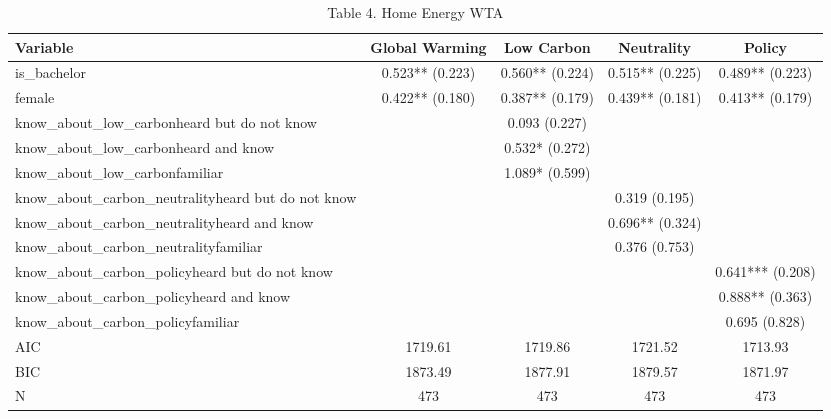 \begin{table}[!htbp]
\centering
\caption{Table 4. Home Energy WTA}
\begin{tabular}{lcccc}
\hline
Variable & Global Warming & Low Carbon & Neutrality & Policy \\
\hline
is\_bachelor & 0.523** (0.223) & 0.560** (0.224) & 0.515** (0.225) & 0.489** (0.223) \\
female & 0.422** (0.180) & 0.387** (0.179) & 0.439** (0.181) & 0.413** (0.179) \\
know\_about\_low\_carbonheard but do not know &  & 0.093 (0.227) &  &  \\
know\_about\_low\_carbonheard and know &  & 0.532* (0.272) &  &  \\
know\_about\_low\_carbonfamiliar &  & 1.089* (0.599) &  &  \\
know\_about\_carbon\_neutralityheard but do not know &  &  & 0.319 (0.195) &  \\
know\_about\_carbon\_neutralityheard and know &  &  & 0.696** (0.324) &  \\
know\_about\_carbon\_neutralityfamiliar &  &  & 0.376 (0.753) &  \\
know\_about\_carbon\_policyheard but do not know &  &  &  & 0.641*** (0.208) \\
know\_about\_carbon\_policyheard and know &  &  &  & 0.888** (0.363) \\
know\_about\_carbon\_policyfamiliar &  &  &  & 0.695 (0.828) \\
AIC & 1719.61 & 1719.86 & 1721.52 & 1713.93 \\
BIC & 1873.49 & 1877.91 & 1879.57 & 1871.97 \\
N & 473 & 473 & 473 & 473 \\
\hline
\end{tabular}
\end{table}
